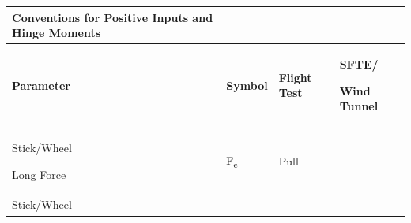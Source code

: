 \documentclass[
]{book}
\begin{document}
\begin{longtable}[]{@{}llll@{}}
\toprule
\begin{minipage}[b]{0.41\columnwidth}\raggedright
\textbf{Conventions for Positive Inputs and Hinge Moments}\strut
\end{minipage} & \begin{minipage}[b]{0.14\columnwidth}\raggedright
\strut
\end{minipage} & \begin{minipage}[b]{0.17\columnwidth}\raggedright
\strut
\end{minipage} & \begin{minipage}[b]{0.17\columnwidth}\raggedright
\strut
\end{minipage}\tabularnewline
\midrule
\endhead
\begin{minipage}[t]{0.41\columnwidth}\raggedright
\textbf{Parameter}\strut
\end{minipage} & \begin{minipage}[t]{0.14\columnwidth}\raggedright
\textbf{Symbol}\strut
\end{minipage} & \begin{minipage}[t]{0.17\columnwidth}\raggedright
\textbf{Flight Test}\strut
\end{minipage} & \begin{minipage}[t]{0.17\columnwidth}\raggedright
\textbf{SFTE/}

\textbf{Wind Tunnel}\strut
\end{minipage}\tabularnewline
\begin{minipage}[t]{0.41\columnwidth}\raggedright
Stick/Wheel

Long Force\strut
\end{minipage} & \begin{minipage}[t]{0.14\columnwidth}\raggedright
F\textsubscript{e}\strut
\end{minipage} & \begin{minipage}[t]{0.17\columnwidth}\raggedright
Pull\strut
\end{minipage} & \begin{minipage}[t]{0.17\columnwidth}\raggedright
\strut
\end{minipage}\tabularnewline
\begin{minipage}[t]{0.41\columnwidth}\raggedright
Stick/Wheel


\end{minipage}
\end{longtable}
\end{document}
